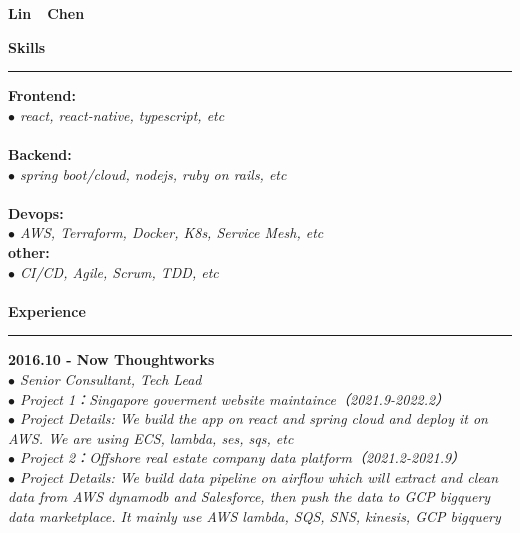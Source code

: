\documentclass[a3paper,12pt,final]{memoir}
\newcommand{\myThemeColor}{RoyalBlue}
\newcommand{\SmallSep}{\vspace{0.9em}}
\newcommand{\CVSection}[1]
	{\Large\textbf{#1}\par
	\vspace{0.2cm}\normalsize\normalfont}
\newcommand{\CVItem}[1]
	{\textbf{\color{\myThemeColor} #1}}
\begin{document}
\begin{CJK*}{UTF8}{gbsn}
\begin{flushright}
	
\end{flushright}\normalsize
\framebreak


\Huge\bfseries {\color{\myThemeColor} Lin~~Chen}\\
\normalsize\normalfont


\CVSection{Skills}
\hrule
\SmallSep
\CVItem{Frontend:}\\
\textit{$\bullet$ react, react-native, typescript, etc} \\
\\
\CVItem{Backend:}\\
\textit{$\bullet$ spring boot/cloud, nodejs, ruby on rails, etc } \\
\\
\CVItem{Devops:}\\
\textit{$\bullet$ AWS, Terraform, Docker, K8s, Service Mesh, etc }\\

\CVItem{other:}\\
\textit{$\bullet$ CI/CD, Agile, Scrum, TDD, etc }\\
\\

\CVSection{Experience}
\hrule
\SmallSep
\CVItem{2016.10 - Now \hfill Thoughtworks}\\
\textit{$\bullet$ Senior Consultant, Tech Lead} \\
\textit{$\bullet$ Project 1：Singapore goverment website maintaince（2021.9-2022.2）} \\
\textit{$\bullet$ Project Details: We build the app on react and spring cloud and deploy it on AWS. We are using ECS, lambda, ses, sqs, etc}\\


\textit{$\bullet$ Project 2：Offshore real estate company data platform（2021.2-2021.9）} \\
\textit{$\bullet$ Project Details: We build data pipeline on airflow which will extract and clean data from AWS dynamodb and Salesforce, then push the data to GCP bigquery data marketplace. It mainly use AWS lambda, SQS, SNS, kinesis, GCP bigquery}\\



\end{CJK*}
\end{document}
